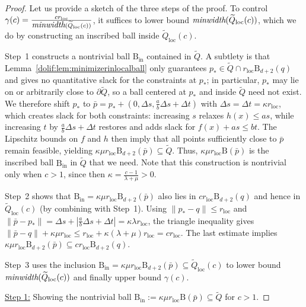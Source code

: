 \documentclass[11pt,letterpaper]{article}
\newcommand{\ball}{\mathrm{B}}
\newcommand{\local}{\mathrm{loc}}
\newcommand{\Q}{\widetilde{Q}}
\begin{document}
\begin{proof}  
Let us provide a sketch of the three steps of the proof.
To control $\gamma(c)=\frac{c r_{\local}}{\mbox{\em minwidth}(\Q_{\local}(c))}$, it suffices to lower bound
$\mbox{\em minwidth}(\Q_{\local}(c))$, which we do by constructing an inscribed ball inside
$\Q_{\local}(c)$.

Step~1 constructs a nontrivial ball $\ball_{\mathrm{in}}$ contained in $\Q$.
A subtlety is that Lemma~\ref{dolif:lem:minimizerinlocalball} only guarantees $ p_*\in \Q\cap r_{\local} \ball_{d+2}( q)$
and gives no quantitative slack for the constraints at $ p_*$; in particular, $ p_*$ may lie on or arbitrarily close to
$\partial\Q$, so a ball centered at $ p_*$ and inside $\Q$ need not exist.
We therefore shift $ p_*$ to
$\bar p= p_*+\left(0,\Delta s,\frac{a}{b}\Delta s+\Delta t\right)$ with $\Delta s=\Delta t=\kappa r_{\local}$,
which creates slack for both constraints: increasing $s$ relaxes $h(x)\le as$, while increasing $t$ by
$\frac{a}{b}\Delta s+\Delta t$ restores and adds slack for $f(x)+as\le bt$.
The Lipschitz bounds on $f$ and $h$ then imply that all points sufficiently close to $\bar p$ remain feasible,
yielding $\kappa\mu r_{\local} \ball_{d+2}(\bar p)\subseteq \Q$. Thus, $\kappa\mu r_{\local} \ball(\bar p)$ is the inscribed ball $\ball_{\mathrm{in}}$ in $\Q$ that we need. Note that this construction is nontrivial only when $c>1$, since then $\kappa=\frac{c-1}{\lambda+\mu}>0$.

Step~2 shows that $\ball_{\mathrm{in}}=\kappa\mu r_{\local}\ball_{d+2}(\bar p)$ also lies in $c r_{\local} \ball_{d+2}( q)$ and hence in $\Q_{\local}(c)$ (by combining with Step~1).
Using $\| p_*- q\|\le r_{\local}$ and
$\|\bar p- p_*\|=\Delta s+\left|\frac{a}{b}\Delta s+\Delta t\right|=\kappa\lambda r_{\local}$,
the triangle inequality gives
$\|\bar p- q\|+\kappa\mu r_{\local}\le r_{\local}+\kappa(\lambda+\mu)r_{\local}=c r_{\local}$. The last estimate implies $\kappa\mu r_{\local}\ball_{d+2}(\bar p)\subseteq c r_{\local}\ball_{d+2}( q)$. 

Step~3 uses the inclusion $\ball_{\mathrm{in}}=\kappa\mu r_{\local} \ball_{d+2}(\bar p)\subseteq \Q_{\local}(c)$ to lower bound $\mbox{\em minwidth}(\Q_{\local}(c))$ and finally upper bound $\gamma(c)$. 





\smallskip
\underline{Step 1:} Showing the nontrivial ball $\ball_{\mathrm{in}}:=\kappa\mu r_\local \ball(\bar p)\subseteq \Q$ for $c>1$.


\end{proof}
\end{document}

